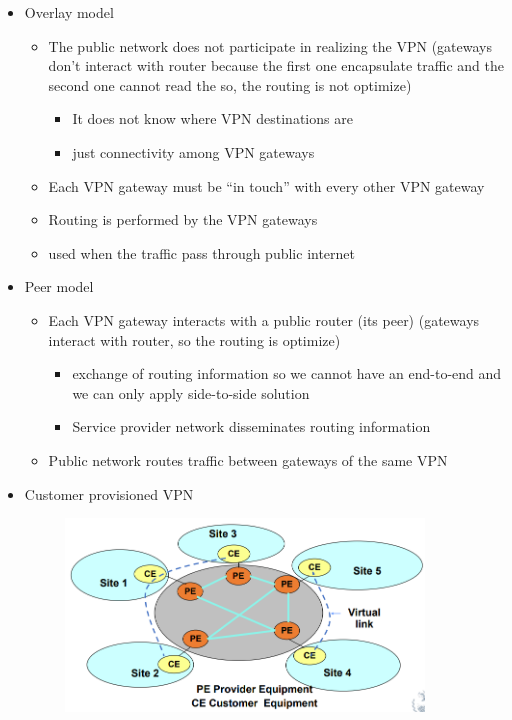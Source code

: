 \documentclass{article}
\begin{document}
\begin{itemize}
\begin{figure}[H]
\end{figure}
    \item Overlay model
    \begin{itemize}
        \item The public network does not participate in realizing the VPN (gateways don't interact with router because the first one encapsulate traffic and the second one cannot read the so, the routing is not optimize)
        \begin{itemize}
            \item It does not know where VPN destinations are
            \item just connectivity among VPN gateways
        \end{itemize}
        \item Each VPN gateway must be “in touch” with every other VPN gateway
        \item Routing is performed by the VPN gateways
        \item used when the traffic pass through public internet
    \end{itemize}
    \item Peer model
    \begin{itemize}
        \item Each VPN gateway interacts with a public router (its peer) (gateways interact with router, so the routing is optimize)
        \begin{itemize}
            \item exchange of routing information so we cannot have an end-to-end and we can only apply side-to-side solution
            \item Service provider network disseminates routing information
        \end{itemize}
        \item Public network routes traffic between gateways of the same VPN
    \end{itemize}
    \item Customer provisioned VPN
    \begin{figure}[H]
        \centering
        \includegraphics[width=0.90\textwidth]{figure/customer_provisioned_VPN.png}

\end{figure}
\end{itemize}
\end{document}
